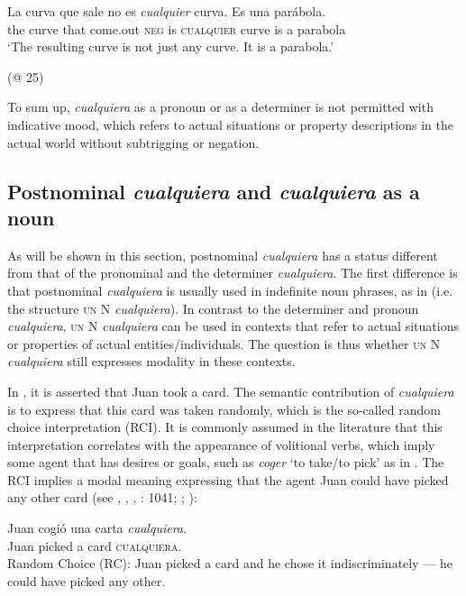 \ea %
\label{ex:key:38}
  \gll La curva que sale no es \textit{cualquier} curva. Es una parábola.\\
the curve that come.out \textsc{neg} is \textsc{cualquier} curve is a parabola\\
  \glt ‘The resulting curve is not just any curve. It is a parabola.’

  (@ 25)
\z

To sum up, \textit{cualquiera} as a pronoun or as a determiner is not permitted with indicative mood, which refers to actual situations or property descriptions in the actual world without subtrigging or negation.

\subsection{{Postnominal} {\textit{cualquiera}}{} {and} {\textit{cualquiera}} {as} {a} {noun}} \label{sec:2.1.2}
\largerpage

As will be shown in this section, postnominal \textit{cualquiera} has a status different from that of the pronominal and the determiner \textit{cualquiera}. The first difference is that postnominal \textit{cualquiera} is usually used in indefinite noun phrases, as in  (i.e. the structure \textsc{un} N \textit{cualquiera}). In contrast to the determiner and pronoun \textit{cualquiera}, \textsc{un} N \textit{cualquiera} can be used in contexts that refer to actual situations or properties of actual entities/individuals. The question is thus whether \textsc{un} N \textit{cualquiera} still expresses modality in these contexts.

In , it is asserted that Juan took a card. The semantic contribution of \textit{cualquiera} is to express that this card was taken randomly, which is the so-called random choice interpretation (RCI). It is commonly assumed in the literature that this interpretation correlates with the appearance of volitional verbs, which imply some agent that has desires or goals, such as \textit{coger} ‘to take/to pick’ as in . The RCI implies a modal meaning expressing that the agent Juan could have picked any other card (see \citealt{Menéndez-Benito2005}, \citealt{ChoiRomero2008}, \citealt{Alonso-OvalleMenéndez-Benito2011,am2018}, \citealt{Sanchezlopez1999}: 1041; \citealt{Arregui2006}; \citealt{Rivero2011}):

\ea %
\label{bkm:Ref533761157} \gll Juan cogió una carta \textit{cualquiera}.\\
Juan picked a card \textsc{cualquiera}.\\
  \glt Random Choice (RC): Juan picked a card and he chose it indiscriminately — he could have picked any other.

